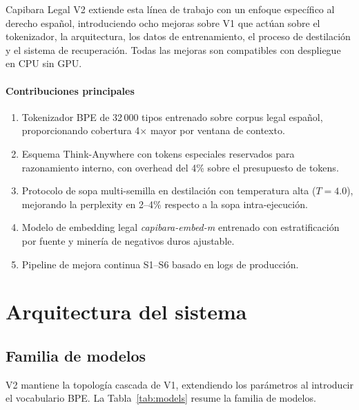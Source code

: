 \documentclass[11pt,a4paper]{article}
\begin{document}
Capibara Legal V2 extiende esta línea de trabajo con un enfoque específico al
derecho español, introduciendo ocho mejoras sobre V1 que actúan sobre el tokenizador,
la arquitectura, los datos de entrenamiento, el proceso de destilación y el sistema
de recuperación. Todas las mejoras son compatibles con despliegue en CPU sin GPU.

\paragraph{Contribuciones principales}
\begin{enumerate}
  \item Tokenizador BPE de 32\,000 tipos entrenado sobre corpus legal español,
        proporcionando cobertura 4$\times$ mayor por ventana de contexto.
  \item Esquema Think-Anywhere con tokens especiales reservados para razonamiento
        interno, con overhead del 4\% sobre el presupuesto de tokens.
  \item Protocolo de sopa multi-semilla en destilación con temperatura alta ($T=4.0$),
        mejorando la perplexity en 2--4\% respecto a la sopa intra-ejecución.
  \item Modelo de embedding legal \textit{capibara-embed-m} entrenado con
        estratificación por fuente y minería de negativos duros ajustable.
  \item Pipeline de mejora continua S1--S6 basado en logs de producción.
\end{enumerate}

\section{Arquitectura del sistema}
\label{sec:architecture}

\subsection{Familia de modelos}

V2 mantiene la topología cascada de V1, extendiendo los parámetros al introducir
el vocabulario BPE. La Tabla~\ref{tab:models} resume la familia de modelos.
\end{document}
